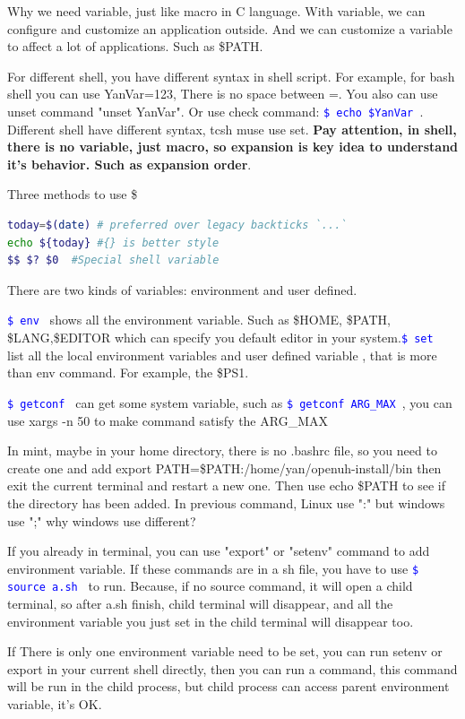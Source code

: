 \documentclass[paper=8.5in:11in, twoside, 12pt, pagesize=pdftex]{book}
\newcommand{\linuxcommand}[1]{\texttt{\textcolor{blue}{\$ #1 \Pisymbol{psy}{191}}}}
\begin{document}
	Why we need variable, just like macro in C language. With variable, we can configure and customize an application outside. And we can customize a variable to affect a lot of applications. Such as \$PATH.
				
	For different shell, you have different syntax in shell script. For example, for bash shell you can use YanVar=123, There is no space between =. You also can use unset command "unset YanVar". Or use check command: \linuxcommand{echo \$YanVar}. Different shell have different syntax, tcsh muse use set. \textbf{Pay attention, in shell, there is no variable, just macro, so expansion is key idea to understand it's behavior. Such as expansion order}.
	
	Three methods to use \$
\begin{lstlisting}[language=bash]
today=$(date) # preferred over legacy backticks `...`
echo ${today} #{} is better style
$$ $? $0  #Special shell variable
\end{lstlisting}

	There are two kinds of variables: environment and user defined.

	\linuxcommand{env} shows all the environment variable. Such as \$HOME,  \$PATH, \$LANG,\$EDITOR which can specify you default editor in your system.\linuxcommand{set} list all the local environment variables and user defined variable , that is more than env command. For example, the \$PS1.  

	\linuxcommand{getconf} can get some system variable, such as \linuxcommand{getconf ARG\_MAX}, you can use xargs -n 50 to make command satisfy the ARG\_MAX
	
	In mint, maybe in your home directory, there is no .bashrc file, so you need to create one and add export PATH=\$PATH:/home/yan/openuh-install/bin  then exit the current terminal and restart a new one. Then use echo \$PATH to see if the directory has been added. In previous command, Linux use ":" but windows use ";" why windows use different?  
			
	If you already in terminal, you can use "export" or "setenv" command to add environment variable. If these commands are in a sh file, you have to use \linuxcommand{source a.sh} to run. Because, if no source command, it will open a child terminal, so after a.sh finish, child terminal will disappear, and all the environment variable you just set in the child terminal will disappear too. 

	If There is only one environment variable need to be set, you can run setenv or export in your current shell directly, then you can run a command, this command will be run in the child process, but child process can access parent environment variable, it's OK.
				
\end{document}
